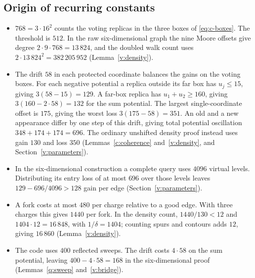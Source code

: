 \subsection{Origin of recurring constants}\label{q:constants-origin}
\begin{itemize}
\item \(768=3\cdot16^2\) counts the voting replicas in the three boxes of \eqref{eq:c-boxes}. The threshold is \(512\). In the raw six-dimensional graph the nine Moore offsets give degree \(2\cdot9\cdot768=13\,824\), and the doubled walk count uses \(2\cdot13\,824^2=382\,205\,952\) (Lemma~\ref{v:density}).
\item The drift \(58\) in each protected coordinate balances the gains on the voting boxes. For each negative potential a replica outside its far box has \(u_j\le15\), giving \(3(58-15)=129\). A far-box replica has \(u_1+u_2\ge160\), giving \(3(160-2\cdot58)=132\) for the sum potential. The largest single-coordinate offset is \(175\), giving the worst loss \(3(175-58)=351\). An old and a new appearance differ by one step of this drift, giving total potential oscillation \(348+174+174=696\). The ordinary unshifted density proof instead uses gain \(130\) and loss \(350\) (Lemmas~\ref{c:coherence} and~\ref{v:density}, and Section~\ref{v:parameters}).
\item In the six-dimensional construction a complete query uses \(4096\) virtual levels. Distributing its entry loss of at most \(696\) over those levels leaves \(129-696/4096>128\) gain per edge (Section~\ref{v:parameters}).
\item A fork costs at most \(480\) per charge relative to a good edge. With three charges this gives \(1440\) per fork. In the density count, \(1440/130<12\) and \(1404\cdot12=16\,848\), with \(1/\delta=1404\); counting spurs and contours adds \(12\), giving \(16\,860\) (Lemma~\ref{v:density}).
\item The code uses \(400\) reflected sweeps. The drift costs \(4\cdot58\) on the sum potential, leaving \(400-4\cdot58=168\) in the six-dimensional proof (Lemmas~\ref{q:sweep} and~\ref{v:bridge}).
\end{itemize}
